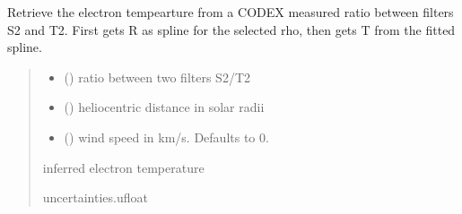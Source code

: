 \documentclass[letterpaper,10pt,english]{sphinxmanual}
\begin{document}
\begin{fulllineitems}
\label{\detokenize{doppler_dimming_lib:doppler_dimming_lib.codex.get_T_from_R}}
\pysigstartsignatures
{}
\pysigstopsignatures
\sphinxAtStartPar
Retrieve the electron tempearture from a CODEX measured ratio between filters S2 and T2. First gets R as spline for the selected rho, then gets T from the fitted spline.
\begin{quote}\begin{description}
\begin{itemize}
\item {} 
\sphinxAtStartPar
{} () \textendash{} ratio between two filters S2/T2

\item {} 
\sphinxAtStartPar
{} () \textendash{} heliocentric distance in solar radii

\item {} 
\sphinxAtStartPar
{} (\sphinxstyleliteralemphasis{\sphinxupquote{, }}) \textendash{} wind speed in km/s. Defaults to 0.

\end{itemize}

\sphinxAtStartPar
inferred electron temperature

\sphinxAtStartPar
uncertainties.ufloat

\end{description}\end{quote}

\end{fulllineitems}

\end{document}
